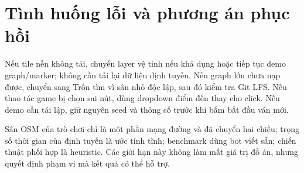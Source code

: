 \section{Tình huống lỗi và phương án phục hồi}

Nếu tile nền không tải, chuyển layer vệ tinh nếu khả dụng hoặc tiếp tục demo
graph/marker; không cần tải lại dữ liệu định tuyến. Nếu graph lớn chưa nạp được,
chuyển sang Trốn tìm vì sân nhỏ độc lập, sau đó kiểm tra Git LFS. Nếu thao tác
game bị chọn sai nút, dùng dropdown điểm đến thay cho click. Nếu demo cần tái lập,
giữ nguyên seed và thông số trước khi bấm bắt đầu ván mới.

\begin{notebox}[title={Giới hạn cần nói công khai khi bảo vệ}]
Sân OSM của trò chơi chỉ là một phần mạng đường và đã chuyển hai chiều; trọng số
thời gian của định tuyến là ước tính tĩnh; benchmark dùng bot viết sẵn; chiến
thuật phối hợp là heuristic. Các giới hạn này không làm mất giá trị đồ án, nhưng
quyết định phạm vi mà kết quả có thể hỗ trợ.
\end{notebox}
